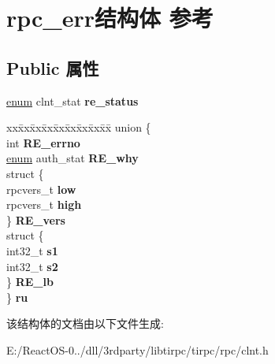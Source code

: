 \hypertarget{structrpc__err}{}\section{rpc\+\_\+err结构体 参考}
\label{structrpc__err}
\subsection*{Public 属性}
\begin{DoxyCompactItemize}
\item 
\mbox{\label{structrpc__err_aa210b657783d738ad9f4aa97caec86ea}} 
\hyperlink{interfaceenum}{enum} clnt\+\_\+stat {\bfseries re\+\_\+status}
\item 
\mbox{\label{structrpc__err_a8f16a204eb898ccebe39778baeb77e52}} 
\begin{tabbing}
xx\=xx\=xx\=xx\=xx\=xx\=xx\=xx\=xx\=\kill
union \{\\
\>int {\bfseries RE\_errno}\\
\>\hyperlink{interfaceenum}{enum} auth\_stat {\bfseries RE\_why}\\
\>struct \{\\
\>\>rpcvers\_t {\bfseries low}\\
\>\>rpcvers\_t {\bfseries high}\\
\>\} {\bfseries RE\_vers}\\
\>struct \{\\
\>\>int32\_t {\bfseries s1}\\
\>\>int32\_t {\bfseries s2}\\
\>\} {\bfseries RE\_lb}\\
\} {\bfseries ru}\\

\end{tabbing}\end{DoxyCompactItemize}


该结构体的文档由以下文件生成\+:\begin{DoxyCompactItemize}
\item 
E\+:/\+React\+O\+S-\/0../dll/3rdparty/libtirpc/tirpc/rpc/clnt.\+h\end{DoxyCompactItemize}
